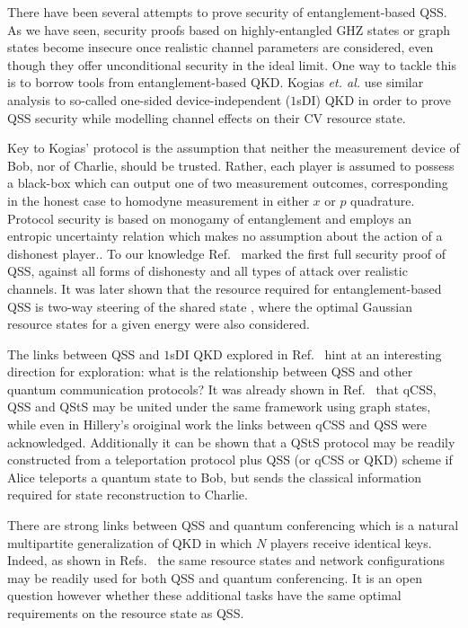 There have been several attempts to prove security of entanglement-based QSS. As we have seen, security proofs based on highly-entangled GHZ states or graph states become insecure once realistic channel parameters are considered, even though they offer unconditional security in the ideal limit. One way to tackle this is to borrow tools from entanglement-based QKD. Kogias \emph{et. al.} use similar analysis to so-called one-sided device-independent ($1$sDI) QKD \cite{Walk2016, Armstrong2015} in order to prove QSS security while modelling channel effects on their CV resource state.

Key to Kogias' protocol is the assumption that neither the measurement device of Bob, nor of Charlie, should be trusted. Rather, each player is assumed to possess a black-box which can output one of two measurement outcomes, corresponding in the honest case to homodyne measurement in either $x$ or $p$ quadrature. Protocol security is based on monogamy of entanglement and employs an entropic uncertainty relation which makes no assumption about the action of a dishonest player.. To our knowledge Ref.~\cite{Kogias2017} marked the first full security proof of QSS, against all forms of dishonesty and all types of attack over realistic channels. It was later shown that the resource required for entanglement-based QSS is two-way steering of the shared state \cite{Xiang2017, Xiang2018}, where the optimal Gaussian resource states for a given energy were also considered. 

The links between QSS and $1$sDI QKD explored in Ref.~\cite{Kogias2017} hint at an interesting direction for exploration: what is the relationship between QSS and other quantum communication protocols? It was already shown in Ref.~\cite{Markham2008a} that qCSS, QSS and QStS may be united under the same framework using graph states, while even in Hillery's oroiginal work \cite{Hillery1999} the links between qCSS and QSS were acknowledged. Additionally it can be shown \cite{Hillery1999} that a QStS protocol may be readily constructed from a teleportation protocol plus QSS (or qCSS or QKD) scheme if Alice teleports a quantum state to Bob, but sends the classical information required for state reconstruction to Charlie.

There are strong links between QSS and quantum conferencing \cite{Wu2016, Ottaviani2017b} which is a natural multipartite generalization of QKD in which $N$ players receive identical keys. Indeed, as shown in Refs.~\cite{Wu2016, Ottaviani2017b} the same resource states and network configurations may be readily used for both QSS and quantum conferencing. It is an open question however whether these additional tasks have the same optimal requirements \cite{Kogias2017, Xiang2017} on the resource state as QSS. %


